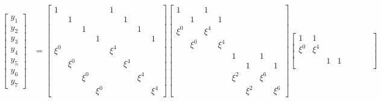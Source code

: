 \documentclass{jsarticle}
\begin{document}
\begin{align*}
\begin{bmatrix}
    y_1 \\
    y_2 \\
    y_3 \\
    y_4 \\
    y_5 \\
    y_6 \\
    y_7
  \end{bmatrix}
  &=
  \begin{bmatrix}
    1     &       &       &       & 1     &       &       &       \\
          & 1     &       &       &       & 1     &       &       \\
          &       & 1     &       &       &       & 1     &       \\
          &       &       & 1     &       &       &       & 1     \\
    \xi^0 &       &       &       & \xi^4 &       &       &       \\
          & \xi^0 &       &       &       & \xi^4 &       &       \\
          &       & \xi^0 &       &       &       & \xi^4 &       \\
          &       &       & \xi^0 &       &       &       & \xi^4
  \end{bmatrix}
  \begin{bmatrix}
    1     &       & 1     &       &       &       &       &       \\
          & 1     &       & 1     &       &       &       &       \\
    \xi^0 &       & \xi^4 &       &       &       &       &       \\
          & \xi^0 &       & \xi^4 &       &       &       &       \\
          &       &       &       & 1     &       & 1     &       \\
          &       &       &       &       & 1     &       & 1     \\
          &       &       &       & \xi^2 &       & \xi^6 &       \\
          &       &       &       &       & \xi^2 &       & \xi^6
  \end{bmatrix}
  \begin{bmatrix}
    1     & 1     &       &       &       &       &       &       \\
    \xi^0 & \xi^4 &       &       &       &       &       &       \\
          &       & 1     & 1     &       &       &       &       \\

\end{bmatrix}
\end{align*}
\end{document}
